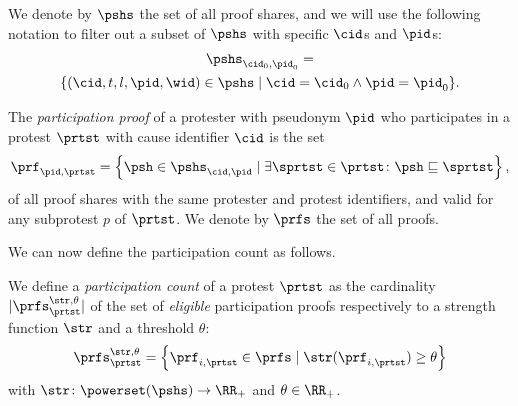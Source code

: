 We denote by \(\pshs\) the set of all proof shares,
and we will use the following notation to filter out a subset of \(\pshs\) with specific \(\cid\)s and \(\pid\)s:
\begin{multline*}
  \pshs_{\cid_0, \pid_0} = \\
  \{(\cid, t, l, \pid, \wid)\in \pshs\mid \cid = \cid_0 \land \pid = \pid_0\}.
\end{multline*}

\begin{definition}%
  \label{DefParticipationProof}\label{DefParticipationProofs}
  The \emph{participation proof} of a protester with pseudonym \(\pid\) who participates in a protest \(\prtst\) with cause identifier \(\cid\) is the 
  set
  \begin{equation}
    \nonumber
    \prf_{\pid, \prtst} =
    \left\{ \psh \in \pshs_{\cid, \pid} \mid
      \exists \sprtst\in \prtst\colon \psh\sqsubseteq \sprtst \right\},
  \end{equation}
  of all proof shares with the same protester and protest identifiers, and valid for any subprotest $p$ of $\prtst$.
  We denote by \(\prfs\) the set of all proofs.
\end{definition}


We can now define the participation count as follows.
\begin{definition}%
  \label{DefParticipationCount}
  We define a \emph{participation count} of a protest \(\prtst\) as the cardinality 
  \(|\prfs_{\prtst}^{\str,\theta}|\) of the set of \emph{eligible} participation proofs respectively to a strength function $\str$ and a threshold $\theta$: \[
    \prfs_{\prtst}^{\str,\theta} = \left\{ \prf_{i,\prtst} \in \prfs \mid
      \str(\prf_{i,\prtst})\geq \theta \right\}
  \] with \(\str\colon \powerset(\pshs)\to \RR_+\) and  \(\theta \in \RR_+\).
\end{definition}

